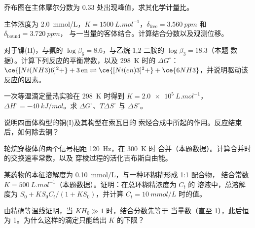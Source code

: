 \begin{exercise}[$\star$]\label{exo:b3:supramolecular:4}
乔布图在主体摩尔分数为 0.33 处出现峰值，求其化学计量比。
\end{exercise}

\begin{exercise}[$\star\star$]\label{exo:b3:supramolecular:5}
主体浓度为 \qty{2.0}{mmol/L}，$K = \qty{1500}{L.mol^{-1}}$，$\delta_{\mathrm{free}} = \qty{3.560}{ppm}$ 和 $\delta_{\mathrm{bound}} = \qty{3.720}{ppm}$，
与一当量的客体结合。计算结合分数以及观测位移。
\end{exercise}

\begin{exercise}[$\star\star$]\label{exo:b3:supramolecular:6}
对于镍(II)，与氨的 $\log\beta_6 = 8.6$，与乙烷-1,2-二胺的 $\log\beta_3 = 18.3$（本题
数据）。计算下列反应的平衡常数，以及 \qty{298}{K} 时的 $\Delta G^\circ$：
$\ce{[Ni(NH3)6]^2+} + 3\,\mathrm{en} \rightleftharpoons \ce{[Ni(en)3]^2+} + \ce{6NH3}$，并说明驱动该反应的因素。
\end{exercise}

\begin{exercise}[$\star\star$]\label{exo:b3:supramolecular:7}
一次等温滴定量热实验在 \qty{298}{K} 时得到 $K = \qty{2.0e5}{L.mol^{-1}}$，$\Delta H^\circ = \qty{-40}{kJ/mol}$。求 $\Delta G^\circ$、$T\Delta S^\circ$ 与
$\Delta S^\circ$。
\end{exercise}

\begin{exercise}[$\star\star$]\label{exo:b3:supramolecular:8}
说明四面体构型的铜(I)及其构型在索瓦日的
索烃合成中所起的作用。反应结束后，如何除去铜？
\end{exercise}

\begin{exercise}[$\star\star$]\label{exo:b3:supramolecular:9}
轮烷穿梭体的两个信号相距 \qty{120}{Hz}，在 \qty{300}{K} 时
合并（本题数据）。计算合并时的交换速率常数，以及
穿梭过程的活化吉布斯自由能。
\end{exercise}

\begin{exercise}[$\star\star\star$]\label{exo:b3:supramolecular:10}
某药物的本征溶解度为 \qty{0.10}{mmol/L}，与一种环糊精形成 1:1 配合物，
结合常数 $K = \qty{500}{L.mol^{-1}}$（本题数据）。证明：在总环糊精浓度为 $C_t$ 的
溶液中，总溶解度为 $S_0 + KS_0C_t/(1 + KS_0)$，并计算 $C_t = \qty{10}{mmol/L}$ 时的值。
\end{exercise}

\begin{exercise}[$\star\star\star$]\label{exo:b3:supramolecular:11}
由精确等温线证明，当 $KH_0 \gg 1$ 时，结合分数先等于
当量数（直至 1），此后恒为 1。为什么这样的滴定只能给出
$K$ 的下限？
\end{exercise}

